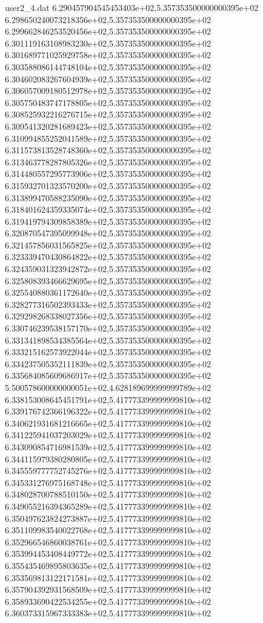\begin{filecontents}{user2_4.dat}
6.290457904545453403e+02,5.357353500000000395e+02
6.298650240073218356e+02,5.357353500000000395e+02
6.299662846253520456e+02,5.357353500000000395e+02
6.301119163108983230e+02,5.357353500000000395e+02
6.301689771025929758e+02,5.357353500000000395e+02
6.303588086144748104e+02,5.357353500000000395e+02
6.304602083267604939e+02,5.357353500000000395e+02
6.306057009180512978e+02,5.357353500000000395e+02
6.305750483747178805e+02,5.357353500000000395e+02
6.308525932216276715e+02,5.357353500000000395e+02
6.309541320281689423e+02,5.357353500000000395e+02
6.310994855252041589e+02,5.357353500000000395e+02
6.311573813528748360e+02,5.357353500000000395e+02
6.313463778287805326e+02,5.357353500000000395e+02
6.314480557295773906e+02,5.357353500000000395e+02
6.315932701323570200e+02,5.357353500000000395e+02
6.313899470588235090e+02,5.357353500000000395e+02
6.318401624359335074e+02,5.357353500000000395e+02
6.319419794309858389e+02,5.357353500000000395e+02
6.320870547395099948e+02,5.357353500000000395e+02
6.321457856031565825e+02,5.357353500000000395e+02
6.323339470430864822e+02,5.357353500000000395e+02
6.324359031323942872e+02,5.357353500000000395e+02
6.325808393466629695e+02,5.357353500000000395e+02
6.325540880361172640e+02,5.357353500000000395e+02
6.328277316502393433e+02,5.357353500000000395e+02
6.329298268338027356e+02,5.357353500000000395e+02
6.330746239538157170e+02,5.357353500000000395e+02
6.331341898534385564e+02,5.357353500000000395e+02
6.333215162573922044e+02,5.357353500000000395e+02
6.334237505352111839e+02,5.357353500000000395e+02
6.335684085609686917e+02,5.357353500000000395e+02
5.500578600000000051e+02,4.628189699999999789e+02
6.338153008645451791e+02,5.417773399999999810e+02
6.339176742366196322e+02,5.417773399999999810e+02
6.340621931681216665e+02,5.417773399999999810e+02
6.341225941037203029e+02,5.417773399999999810e+02
6.343090854716981539e+02,5.417773399999999810e+02
6.344115979380280805e+02,5.417773399999999810e+02
6.345559777752745276e+02,5.417773399999999810e+02
6.345331276975168748e+02,5.417773399999999810e+02
6.348028700788510150e+02,5.417773399999999810e+02
6.349055216394365289e+02,5.417773399999999810e+02
6.350497623824273887e+02,5.417773399999999810e+02
6.351109983540022768e+02,5.417773399999999810e+02
6.352966546860038761e+02,5.417773399999999810e+02
6.353994453408449772e+02,5.417773399999999810e+02
6.355435469895803635e+02,5.417773399999999810e+02
6.353569813122171581e+02,5.417773399999999810e+02
6.357904392931568509e+02,5.417773399999999810e+02
6.358933690422534255e+02,5.417773399999999810e+02
6.360373315967333383e+02,5.417773399999999810e+02

\end{filecontents}

